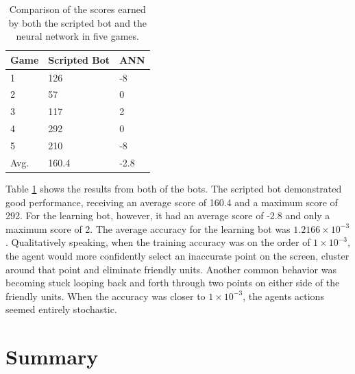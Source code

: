 \documentclass{amsart}
\theoremstyle{definition}
\begin{document}
\begin{table}[]
\caption{Comparison of the scores earned by both the scripted bot and the neural network in five games.}
\label{tab:scores}
\begin{tabular}{|l|l|l|}
\hline
Game & Scripted Bot & ANN  \\ \hline
1    & 126          & -8   \\ \hline
2    & 57           & 0    \\ \hline
3    & 117          & 2    \\ \hline
4    & 292          & 0    \\ \hline
5    & 210          & -8   \\ \hline
Avg. & 160.4        & -2.8 \\ \hline
\end{tabular}
\end{table}


Table \ref{tab:scores} shows the results from both of the bots.
The scripted bot demonstrated good performance, receiving an average score of 160.4 and a maximum score of 292.
For the learning bot, however, it had an average score of -2.8 and only a maximum score of 2.
The average accuracy for the learning bot was $1.2166 \times 10^{-3}$.
Qualitatively speaking, when the training accuracy was on the order of $1 \times 10^{-3}$, the agent would more confidently select an inaccurate point on the screen, cluster around that point and eliminate friendly units.
Another common behavior was becoming stuck looping back and forth through two points on either side of the friendly units.
When the accuracy was closer to $1 \times 10^{-3}$, the agents actions seemed entirely stochastic.









\section{Summary}
\end{document}
